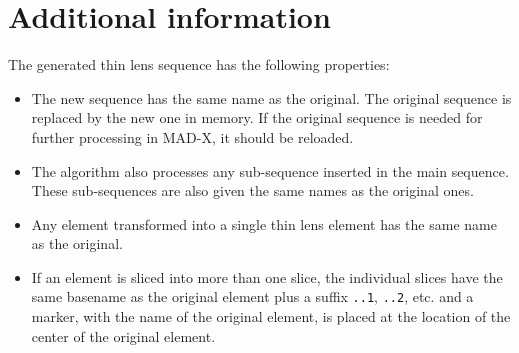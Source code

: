 \section{Additional information}

The generated thin lens sequence has the following properties: 
\begin{itemize}
\item The new sequence has the same name as the original. The original sequence
  is replaced by the new one in memory. If the original sequence is
  needed for further processing in MAD-X, it should be reloaded.
\item The algorithm also processes any sub-sequence inserted in the main
  sequence. These sub-sequences are also given the same names as the
  original ones. 
\item Any element transformed into a single thin lens element has the
  same name as the original. 
\item If an element is sliced into more than one slice, the individual
  slices have the same basename as the original element plus a suffix 
  {\tt ..1}, {\tt ..2}, etc. and a marker, with the name of the original
  element, is placed at the location of the center of the original element.
\end{itemize}


